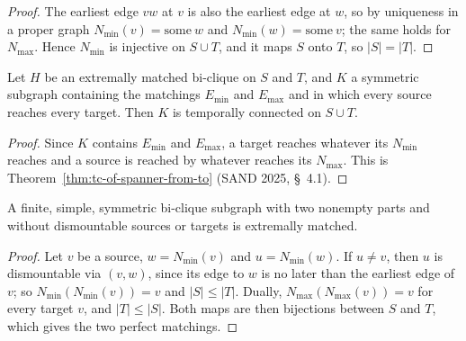 \begin{proof}
  \leanok
  The earliest edge $vw$ at $v$ is also the earliest edge at $w$, so by
  uniqueness in a proper graph $N_{\min}(v) = \mathrm{some}\ w$ and
  $N_{\min}(w) = \mathrm{some}\ v$; the same holds for $N_{\max}$. Hence
  $N_{\min}$ is injective on $S \cup T$, and it maps $S$ onto $T$, so
  $|S| = |T|$.
\end{proof}

\begin{theorem}
  \label{thm:extremally-matched-tc}
  \leanok
  Let $H$ be an extremally matched bi-clique on $S$ and $T$, and $K$ a
  symmetric subgraph containing the matchings $E_{\min}$ and $E_{\max}$ and in
  which every source reaches every target. Then $K$ is temporally connected on
  $S \cup T$.
\end{theorem}

\begin{proof}
  \leanok
  Since $K$ contains $E_{\min}$ and $E_{\max}$, a target reaches whatever its
  $N_{\min}$ reaches and a source is reached by whatever reaches its $N_{\max}$.
  This is Theorem~\ref{thm:tc-of-spanner-from-to} (SAND 2025, \S~4.1).
\end{proof}

\begin{lemma}
  \label{lem:extremally-matched-of-not-dismountable}
  \leanok
  A finite, simple, symmetric bi-clique subgraph with two nonempty parts and
  without dismountable sources or targets is extremally matched.
\end{lemma}

\begin{proof}
  \leanok
  Let $v$ be a source, $w = N_{\min}(v)$ and $u = N_{\min}(w)$. If $u \ne v$,
  then $u$ is dismountable via $(v, w)$, since its edge to $w$ is no later than
  the earliest edge of $v$; so $N_{\min}(N_{\min}(v)) = v$ and $|S| \le |T|$.
  Dually, $N_{\max}(N_{\max}(v)) = v$ for every target $v$, and $|T| \le |S|$.
  Both maps are then bijections between $S$ and $T$, which gives the two
  perfect matchings.
\end{proof}

